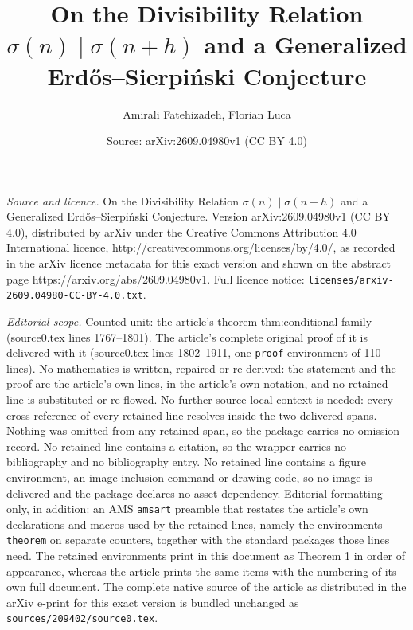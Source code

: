 \documentclass[10pt,a4paper]{amsart}
\title{On the Divisibility Relation $\sigma(n)\mid\sigma(n+h)$ and a Generalized Erd\H{o}s--Sierpi\'nski Conjecture}
\author{Amirali Fatehizadeh, Florian Luca}
\date{Source: arXiv:2609.04980v1 (CC BY 4.0)}
\begin{document}
\maketitle

\noindent\emph{Source and licence.} On the Divisibility Relation $\sigma(n)\mid\sigma(n+h)$ and a Generalized Erd\H{o}s--Sierpi\'nski Conjecture. Version arXiv:2609.04980v1 (CC BY 4.0), distributed by arXiv under the Creative Commons Attribution 4.0 International licence, http://creativecommons.org/licenses/by/4.0/, as recorded in the arXiv licence metadata for this exact version and shown on the abstract page https://arxiv.org/abs/2609.04980v1. Full licence notice: \texttt{licenses/arxiv-2609.04980-CC-BY-4.0.txt}.\par\smallskip

\noindent\textit{Editorial scope.} Counted unit: the article's theorem thm:conditional-family (source0.tex lines 1767--1801). The article's complete original proof of it is delivered with it (source0.tex lines 1802--1911, one \texttt{proof} environment of 110 lines). No mathematics is written, repaired or re-derived: the statement and the proof are the article's own lines, in the article's own notation, and no retained line is substituted or re-flowed.  No further source-local context is needed: every cross-reference of every retained line resolves inside the two delivered spans.  Nothing was omitted from any retained span, so the package carries no omission record.  No retained line contains a citation, so the wrapper carries no bibliography and no bibliography entry.  No retained line contains a figure environment, an image-inclusion command or drawing code, so no image is delivered and the package declares no asset dependency.  Editorial formatting only, in addition: an AMS \texttt{amsart} preamble that restates the article's own declarations and macros used by the retained lines, namely the environments \texttt{theorem} on separate counters, together with the standard packages those lines need.  The retained environments print in this document as Theorem 1 in order of appearance, whereas the article prints the same items with the numbering of its own full document.  The complete native source of the article as distributed in the arXiv e-print for this exact version is bundled unchanged as \texttt{sources/209402/source0.tex}.
\end{document}
